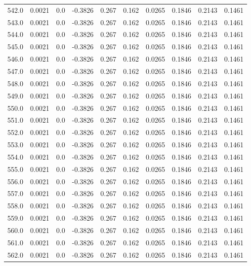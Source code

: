 \begin{longtable}{lrrrrrrrrr}
542.0 & 0.0021 & 0.0 & -0.3826 & 0.267 & 0.162 & 0.0265 & 0.1846 & 0.2143 & 0.1461 \\
543.0 & 0.0021 & 0.0 & -0.3826 & 0.267 & 0.162 & 0.0265 & 0.1846 & 0.2143 & 0.1461 \\
544.0 & 0.0021 & 0.0 & -0.3826 & 0.267 & 0.162 & 0.0265 & 0.1846 & 0.2143 & 0.1461 \\
545.0 & 0.0021 & 0.0 & -0.3826 & 0.267 & 0.162 & 0.0265 & 0.1846 & 0.2143 & 0.1461 \\
546.0 & 0.0021 & 0.0 & -0.3826 & 0.267 & 0.162 & 0.0265 & 0.1846 & 0.2143 & 0.1461 \\
547.0 & 0.0021 & 0.0 & -0.3826 & 0.267 & 0.162 & 0.0265 & 0.1846 & 0.2143 & 0.1461 \\
548.0 & 0.0021 & 0.0 & -0.3826 & 0.267 & 0.162 & 0.0265 & 0.1846 & 0.2143 & 0.1461 \\
549.0 & 0.0021 & 0.0 & -0.3826 & 0.267 & 0.162 & 0.0265 & 0.1846 & 0.2143 & 0.1461 \\
550.0 & 0.0021 & 0.0 & -0.3826 & 0.267 & 0.162 & 0.0265 & 0.1846 & 0.2143 & 0.1461 \\
551.0 & 0.0021 & 0.0 & -0.3826 & 0.267 & 0.162 & 0.0265 & 0.1846 & 0.2143 & 0.1461 \\
552.0 & 0.0021 & 0.0 & -0.3826 & 0.267 & 0.162 & 0.0265 & 0.1846 & 0.2143 & 0.1461 \\
553.0 & 0.0021 & 0.0 & -0.3826 & 0.267 & 0.162 & 0.0265 & 0.1846 & 0.2143 & 0.1461 \\
554.0 & 0.0021 & 0.0 & -0.3826 & 0.267 & 0.162 & 0.0265 & 0.1846 & 0.2143 & 0.1461 \\
555.0 & 0.0021 & 0.0 & -0.3826 & 0.267 & 0.162 & 0.0265 & 0.1846 & 0.2143 & 0.1461 \\
556.0 & 0.0021 & 0.0 & -0.3826 & 0.267 & 0.162 & 0.0265 & 0.1846 & 0.2143 & 0.1461 \\
557.0 & 0.0021 & 0.0 & -0.3826 & 0.267 & 0.162 & 0.0265 & 0.1846 & 0.2143 & 0.1461 \\
558.0 & 0.0021 & 0.0 & -0.3826 & 0.267 & 0.162 & 0.0265 & 0.1846 & 0.2143 & 0.1461 \\
559.0 & 0.0021 & 0.0 & -0.3826 & 0.267 & 0.162 & 0.0265 & 0.1846 & 0.2143 & 0.1461 \\
560.0 & 0.0021 & 0.0 & -0.3826 & 0.267 & 0.162 & 0.0265 & 0.1846 & 0.2143 & 0.1461 \\
561.0 & 0.0021 & 0.0 & -0.3826 & 0.267 & 0.162 & 0.0265 & 0.1846 & 0.2143 & 0.1461 \\
562.0 & 0.0021 & 0.0 & -0.3826 & 0.267 & 0.162 & 0.0265 & 0.1846 & 0.2143 & 0.1461 \\

\end{longtable}
